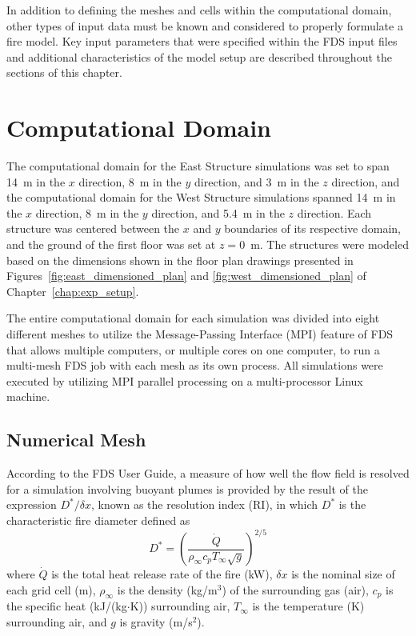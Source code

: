 In addition to defining the meshes and cells within the computational domain, other types of input data must be known and considered to properly formulate a fire model. Key input parameters that were specified within the FDS input files and additional characteristics of the model setup are described throughout the sections of this chapter.

\section{Computational Domain}
The computational domain for the East Structure simulations was set to span 14~m in the $x$ direction, 8~m in the $y$ direction, and 3~m in the $z$ direction, and the computational domain for the West Structure simulations spanned 14~m in the $x$ direction, 8~m in the $y$ direction, and 5.4~m in the $z$ direction. Each structure was centered between the $x$ and $y$ boundaries of its respective domain, and the ground of the first floor was set at $z=0$~m. The structures were modeled based on the dimensions shown in the floor plan drawings presented in Figures~\ref{fig:east_dimensioned_plan} and \ref{fig:west_dimensioned_plan} of Chapter~\ref{chap:exp_setup}. 

The entire computational domain for each simulation was divided into eight different meshes to utilize the Message-Passing Interface (MPI) feature of FDS that allows multiple computers, or multiple cores on one computer, to run a multi-mesh FDS job with each mesh as its own process. All simulations were executed by utilizing MPI parallel processing on a multi-processor Linux machine.

\subsection{Numerical Mesh}
\label{subsec:mesh}
According to the FDS User Guide, a measure of how well the flow field is resolved for a simulation involving buoyant plumes is provided by the result of the expression $D^*/\delta x$, known as the resolution index (RI), in which $D^*$ is the characteristic fire diameter defined as
\begin{equation}
\label{eq:Dstar}
	D^* = \left( \frac{\dot{Q}}{\rho_\infty c_p T_\infty \sqrt{g}}\right)^{2/5}
\end{equation}
where $\dot{Q}$ is the total heat release rate of the fire (kW), $\delta x$ is the nominal size of each grid cell (m), $\rho_\infty$ is the density (kg/m$^3$) of the surrounding gas (air), $c_p$ is the specific heat (kJ/(kg$\cdot$K)) surrounding air, $T_\infty$ is the temperature (K) surrounding air, and $g$ is gravity (m/s$^2$). 

